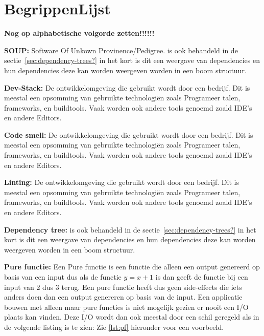 
\chapter{BegrippenLijst}\label{ch:begrippenlijst}





\textbf{Nog op alphabetische volgorde zetten!!!!!!}

\textbf{SOUP: } Software Of Unkown Provinence/Pedigree. is ook behandeld in de sectie~\ref{sec:dependency-trees?} in het kort is dit een weergave van dependencies en hun dependencies deze kan worden weergeven worden in een boom structuur.
\smallskip

\textbf{Dev-Stack: } De ontwikkelomgeving die gebruikt wordt door een bedrijf. Dit is meestal een opsomming van gebruikte technologiën zoals Programeer talen, frameworks, en buildtools. Vaak worden ook andere tools genoemd zoald IDE's en andere Editors.
\smallskip

\textbf{Code smell: } De ontwikkelomgeving die gebruikt wordt door een bedrijf. Dit is meestal een opsomming van gebruikte technologiën zoals Programeer talen, frameworks, en buildtools. Vaak worden ook andere tools genoemd zoald IDE's en andere Editors.
\smallskip

\textbf{Linting: } De ontwikkelomgeving die gebruikt wordt door een bedrijf. Dit is meestal een opsomming van gebruikte technologiën zoals Programeer talen, frameworks, en buildtools. Vaak worden ook andere tools genoemd zoald IDE's en andere Editors.
\smallskip




\textbf{Dependency tree: } is ook behandeld in de sectie~\ref{sec:dependency-trees?} in het kort is dit een weergave van dependencies en hun dependencies deze kan worden weergeven worden in een boom structuur.
\smallskip

\textbf{Pure functie: }
Een Pure functie is een functie die alleen een output genereerd op basis van een input dus als de functie \( y = x+1\) is dan geeft de functie bij een input van 2 dus 3 terug.
Een pure functie heeft dus geen side-effects die iets anders doen dan een output genereren op basis van de input.
Een applicatie bouwen met alleen maar pure functies is niet mogelijk gezien er nooit een I/O plaats kan vinden.
Deze I/O wordt dan ook meestal door een schil geregeld als in de volgende listing is te zien:
Zie \autoref{lst:pf} hieronder voor een voorbeeld.

